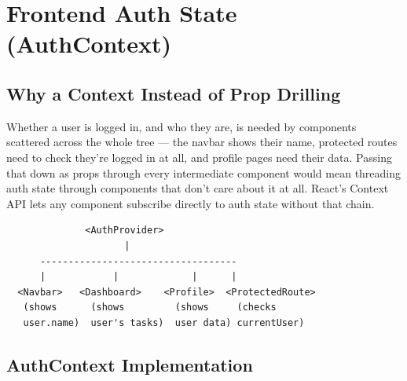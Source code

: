 \chapter{Frontend Auth State (AuthContext)}

\section{Why a Context Instead of Prop Drilling}

Whether a user is logged in, and who they are, is needed by components
scattered across the whole tree --- the navbar shows their name, protected
routes need to check they're logged in at all, and profile pages need their
data. Passing that down as props through every intermediate component would
mean threading auth state through components that don't care about it at
all. React's Context API lets any component subscribe directly to auth
state without that chain.

\begin{diagrambox}
\begin{verbatim}
              <AuthProvider>
                     |
      -----------------------------------
      |            |             |      |
  <Navbar>   <Dashboard>    <Profile>  <ProtectedRoute>
   (shows      (shows         (shows     (checks
   user.name)  user's tasks)  user data) currentUser)
\end{verbatim}
\end{diagrambox}

\section{AuthContext Implementation}

